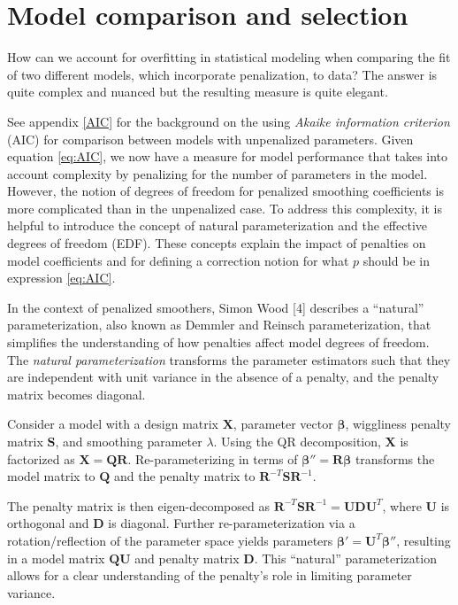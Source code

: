\documentclass[
11pt, %
oneside, %
english, %
singlespacing, %
]{macthesis} %
\begin{document}
\section{Model comparison and selection}\label{Model-comparison-and-selection}

How can we account for overfitting in statistical modeling when comparing the fit of two different models, which incorporate penalization, to data? The answer is quite complex and nuanced but the resulting measure is quite elegant.

See appendix \ref{AIC} for the background on the using \emph{Akaike information criterion} (AIC) for comparison between models with unpenalized parameters. Given equation \ref{eq:AIC}, we now have a measure for model performance that takes into account complexity by penalizing for the number of parameters in the model. However, the notion of degrees of freedom for penalized smoothing coefficients is more complicated than in the unpenalized case. To address this complexity, it is helpful to introduce the concept of natural parameterization and the effective degrees of freedom (EDF). These concepts explain the impact of penalties on model coefficients and for defining a correction notion for what \(p\) should be in expression \ref{eq:AIC}.

In the context of penalized smoothers, Simon Wood {[}4{]} describes a ``natural'' parameterization, also known as Demmler and Reinsch parameterization, that simplifies the understanding of how penalties affect model degrees of freedom. The \emph{natural parameterization} transforms the parameter estimators such that they are independent with unit variance in the absence of a penalty, and the penalty matrix becomes diagonal.

Consider a model with a design matrix \(\mathbf{X}\), parameter vector \(\boldsymbol{\beta}\), wiggliness penalty matrix \(\mathbf{S}\), and smoothing parameter \(\lambda\). Using the QR decomposition, \(\mathbf{X}\) is factorized as \(\mathbf{X} = \mathbf{Q} \mathbf{R}\). Re-parameterizing in terms of \(\boldsymbol{\beta''} = \mathbf{R} \boldsymbol{\beta}\) transforms the model matrix to \(\mathbf{Q}\) and the penalty matrix to \(\mathbf{R}^{-T} \mathbf{S} \mathbf{R}^{-1}\).

The penalty matrix is then eigen-decomposed as \(\mathbf{R}^{-T} \mathbf{S} \mathbf{R}^{-1} = \mathbf{U} \mathbf{D} \mathbf{U}^T\), where \(\mathbf{U}\) is orthogonal and \(\mathbf{D}\) is diagonal. Further re-parameterization via a rotation/reflection of the parameter space yields parameters \(\boldsymbol{\beta'} = \mathbf{U}^T \boldsymbol{\beta''}\), resulting in a model matrix \(\mathbf{Q} \mathbf{U}\) and penalty matrix \(\mathbf{D}\). This ``natural'' parameterization allows for a clear understanding of the penalty's role in limiting parameter variance.
\end{document}
